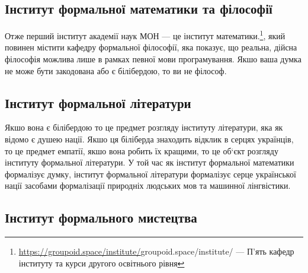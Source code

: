 \subsection{Інститут формальної математики та філософії}

Отже перший інститут академії наук МОН — це інститут математики.\footnote{ \url{https://groupoid.space/institute/}{groupoid.space/institute/} --- П'ять кафедр інституту та курси другого освітнього рівня}, який повинен містити кафедру формальної філософії, яка показує, що реальна, дійсна філософія можлива лише в рамках певної мови програмування. Якшо ваша думка не може бути закодована або є білібердою, то ви не філософ.
\\

\subsection{Інститут формальної літератури}

Якшо вона є білібердою то це предмет розгляду інституту літератури, яка як відомо є душею нації. Якшо ця біліберда знаходить відклик в серцях українців, то це предмет емпатії, якшо вона робить їх кращими, то це об‘єкт розгляду інституту формальної літератури. У той час як інститут формальної математики формалізує думку, інститут формальної літератури формалізує серце української нації засобами формалізації природніх людських мов та машинної лінгвістики.
\\

\subsection{Інститут формального мистецтва}

